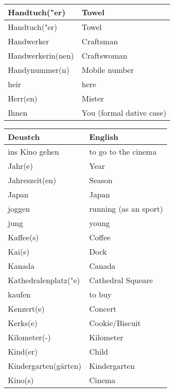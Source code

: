\documentclass{article}
\renewcommand{\arraystretch}{1}
\begin{document}
\begin{minipage}{0.48\textwidth}
\begin{tabular}{|>{\raggedright\arraybackslash}p{3.5cm}|>{\raggedright\arraybackslash}p{3.5cm}|}
        Handtuch("er) & Towel \\\hline
        Handtuch("er) & Towel \\\hline
        Handwerker & Craftsman \\\hline
        Handwerkerin(nen) & Craftswoman \\\hline
        Handynummer(n) & Mobile number \\\hline
        heir & here \\\hline
        Herr(en) & Mister \\\hline
        Ihnen & You (formal dative case) \\\hline
    \end{tabular}
\end{minipage}

\newpage

\begin{minipage}{0.48\textwidth}
    \centering
    \renewcommand{\arraystretch}{1.5}
    \begin{tabular}{|>{\raggedright\arraybackslash}p{3.5cm}|>{\raggedright\arraybackslash}p{3.5cm}|}
        \hline
        \rowcolor{gray!20} \textbf{Deustch} & \textbf{English} \\
        \hline
        ins Kino gehen & to go to the cinema \\\hline
        Jahr(e) & Year \\\hline
        Jahreszeit(en) & Season \\\hline
        Japan & Japan \\\hline
        joggen & running (as an sport) \\\hline
        jung & young \\\hline
        Kaffee(s) & Coffee \\\hline
        Kai(s) & Dock \\\hline
        Kanada & Canada \\\hline
        Kathedralenplatz("e) & Cathedral Squeare \\\hline
        kaufen & to buy \\\hline
        Kenzert(e) & Concert \\\hline
        Kerks(e) & Cookie/Biscuit \\\hline
        Kilometer(-) & Kilometer \\\hline
        Kind(er) & Child \\\hline
        Kindergarten(gärten) & Kindergarten \\\hline
        Kino(s) & Cinema \\\hline

\end{tabular}
\end{minipage}
\end{document}
